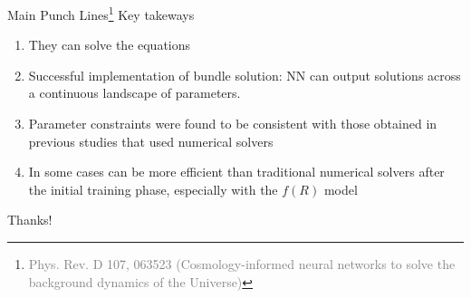 \documentclass[aspectratio=169, 12pt]{beamer}
\newcommand{\gray}[1]{\textcolor{gray}{#1}}
\begin{document}
\begin{frame}{Main Punch Lines\footnote{\tiny{\gray{Phys. Rev. D 107, 063523 (Cosmology-informed neural networks to solve the background dynamics of the Universe)}}}}
Key takeways\pause
\begin{enumerate}
	\item \alert{They can solve the equations}\pause
	\item Successful implementation of \alert{bundle solution}: NN can output solutions across a continuous landscape of parameters.\pause
	\item Parameter constraints were found to be consistent with those obtained in previous studies that used numerical solvers\pause
	\item In some cases can be \alert{more efficient than traditional numerical solvers} after the initial training phase, especially with the $f(R)$ model
\end{enumerate}
\end{frame}
\begin{frame}
  \centering %
  \vspace*{\fill} %
  \Huge \alert{Thanks!}
  \vspace*{\fill} %
\end{frame}
\end{document}

